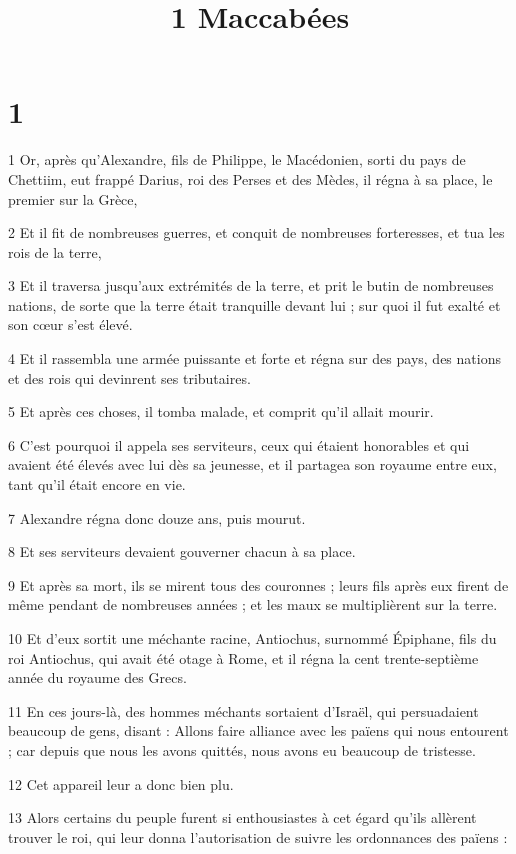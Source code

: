 

\title{1 Maccabées}

\chapter{1}

\par 1 Or, après qu'Alexandre, fils de Philippe, le Macédonien, sorti du pays de Chettiim, eut frappé Darius, roi des Perses et des Mèdes, il régna à sa place, le premier sur la Grèce,
\par 2 Et il fit de nombreuses guerres, et conquit de nombreuses forteresses, et tua les rois de la terre,
\par 3 Et il traversa jusqu'aux extrémités de la terre, et prit le butin de nombreuses nations, de sorte que la terre était tranquille devant lui ; sur quoi il fut exalté et son cœur s'est élevé.
\par 4 Et il rassembla une armée puissante et forte et régna sur des pays, des nations et des rois qui devinrent ses tributaires.
\par 5 Et après ces choses, il tomba malade, et comprit qu'il allait mourir.
\par 6 C'est pourquoi il appela ses serviteurs, ceux qui étaient honorables et qui avaient été élevés avec lui dès sa jeunesse, et il partagea son royaume entre eux, tant qu'il était encore en vie.
\par 7 Alexandre régna donc douze ans, puis mourut.
\par 8 Et ses serviteurs devaient gouverner chacun à sa place.
\par 9 Et après sa mort, ils se mirent tous des couronnes ; leurs fils après eux firent de même pendant de nombreuses années ; et les maux se multiplièrent sur la terre.
\par 10 Et d'eux sortit une méchante racine, Antiochus, surnommé Épiphane, fils du roi Antiochus, qui avait été otage à Rome, et il régna la cent trente-septième année du royaume des Grecs.
\par 11 En ces jours-là, des hommes méchants sortaient d'Israël, qui persuadaient beaucoup de gens, disant : Allons faire alliance avec les païens qui nous entourent ; car depuis que nous les avons quittés, nous avons eu beaucoup de tristesse.
\par 12 Cet appareil leur a donc bien plu.
\par 13 Alors certains du peuple furent si enthousiastes à cet égard qu'ils allèrent trouver le roi, qui leur donna l'autorisation de suivre les ordonnances des païens :
